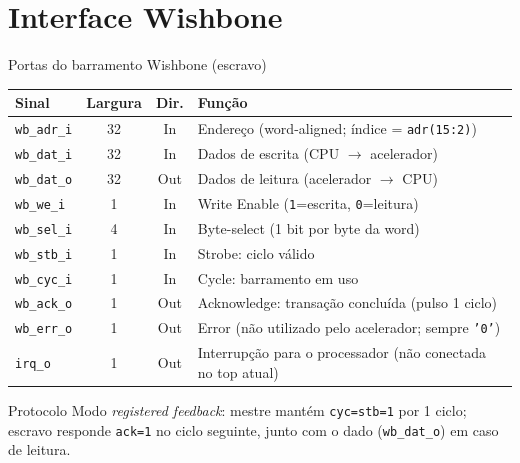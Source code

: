 \documentclass[aspectratio=169,10pt]{beamer}
\begin{document}
\section{Interface Wishbone}

\begin{frame}{Portas do barramento Wishbone (escravo)}
  \small
  \begin{tabularx}{\linewidth}{lccX}
    \toprule
    \textbf{Sinal} & \textbf{Largura} & \textbf{Dir.} & \textbf{Função} \\
    \midrule
    \texttt{wb\_adr\_i} & 32 & In & Endereço (word-aligned; índice = \texttt{adr(15:2)}) \\
    \texttt{wb\_dat\_i} & 32 & In & Dados de escrita (CPU $\to$ acelerador) \\
    \texttt{wb\_dat\_o} & 32 & Out & Dados de leitura (acelerador $\to$ CPU) \\
    \texttt{wb\_we\_i}  & 1 & In & Write Enable (\texttt{1}=escrita, \texttt{0}=leitura) \\
    \texttt{wb\_sel\_i} & 4 & In & Byte-select (1 bit por byte da word) \\
    \texttt{wb\_stb\_i} & 1 & In & Strobe: ciclo válido \\
    \texttt{wb\_cyc\_i} & 1 & In & Cycle: barramento em uso \\
    \texttt{wb\_ack\_o} & 1 & Out & Acknowledge: transação concluída (pulso 1 ciclo) \\
    \texttt{wb\_err\_o} & 1 & Out & Error (não utilizado pelo acelerador; sempre \texttt{'0'}) \\
    \texttt{irq\_o}     & 1 & Out & Interrupção para o processador (não conectada no top atual) \\
    \bottomrule
  \end{tabularx}

  \vspace{1em}
  \begin{block}{Protocolo}
    Modo \emph{registered feedback}: mestre mantém \texttt{cyc=stb=1} por 1 ciclo;
    escravo responde \texttt{ack=1} no ciclo seguinte, junto com o dado
    (\texttt{wb\_dat\_o}) em caso de leitura.
  \end{block}
\end{frame}
\end{document}
